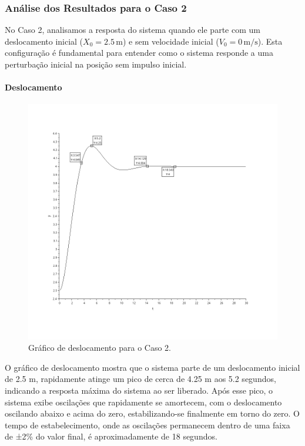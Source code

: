 \subsubsection{Análise dos Resultados para o Caso 2}
No Caso 2, analisamos a resposta do sistema quando ele parte com um deslocamento inicial (\(X_0 = 2.5 \, \text{m}\)) e sem velocidade inicial (\(V_0 = 0 \, \text{m/s}\)). Esta configuração é fundamental para entender como o sistema responde a uma perturbação inicial na posição sem impulso inicial.

\paragraph{Deslocamento}
\begin{figure}[H]
    \centering
    \includegraphics[height=0.7\textwidth]{final/2-atividade/assets/deslocamento-caso-2.png}
    \caption{Gráfico de deslocamento para o Caso 2.}
\end{figure}
O gráfico de deslocamento mostra que o sistema parte de um deslocamento inicial de 2.5 m, rapidamente atinge um pico de cerca de 4.25 m aos 5.2 segundos, indicando a resposta máxima do sistema ao ser liberado. Após esse pico, o sistema exibe oscilações que rapidamente se amortecem, com o deslocamento oscilando abaixo e acima do zero, estabilizando-se finalmente em torno do zero. O tempo de estabelecimento, onde as oscilações permanecem dentro de uma faixa de ±2\% do valor final, é aproximadamente de 18 segundos.

